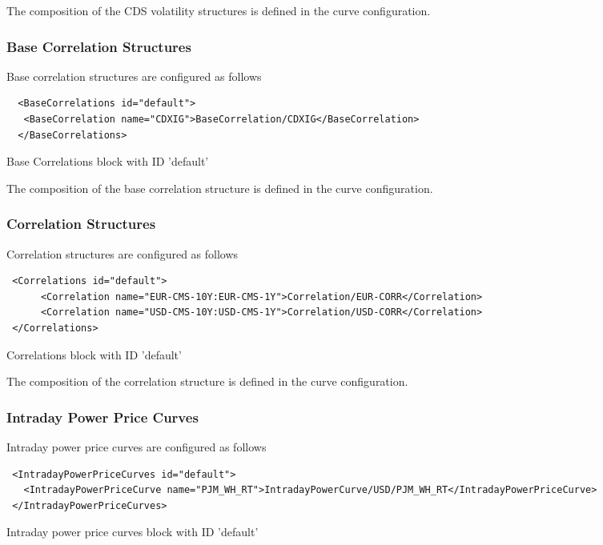 {The composition of the CDS volatility structures is defined in the curve configuration.

\subsubsection{Base Correlation Structures}

Base correlation structures are configured as follows
\begin{listing}[H]
\begin{verbatim}
  <BaseCorrelations id="default">
   <BaseCorrelation name="CDXIG">BaseCorrelation/CDXIG</BaseCorrelation>
  </BaseCorrelations>
\end{verbatim}
\caption{Base Correlations block with ID 'default'}
\label{lst:basecorr_spec}
\end{listing}

The composition of the base correlation structure is defined in the curve configuration.

\subsubsection{Correlation Structures}

Correlation structures are configured as follows
\begin{listing}[H]
\begin{verbatim}
 <Correlations id="default">
      <Correlation name="EUR-CMS-10Y:EUR-CMS-1Y">Correlation/EUR-CORR</Correlation>  
      <Correlation name="USD-CMS-10Y:USD-CMS-1Y">Correlation/USD-CORR</Correlation>
 </Correlations>
\end{verbatim}
\caption{Correlations block with ID 'default'}
\label{lst:corr_spec}
\end{listing}

The composition of the correlation structure is defined in the curve configuration.

\subsubsection{Intraday Power Price Curves}

Intraday power price curves are configured as follows
\begin{listing}[H]
\begin{verbatim}
 <IntradayPowerPriceCurves id="default">
   <IntradayPowerPriceCurve name="PJM_WH_RT">IntradayPowerCurve/USD/PJM_WH_RT</IntradayPowerPriceCurve>
 </IntradayPowerPriceCurves>
\end{verbatim}
\caption{Intraday power price curves block with ID 'default'}
\label{lst:intraday_power_curve_spec}
\end{listing}

}
